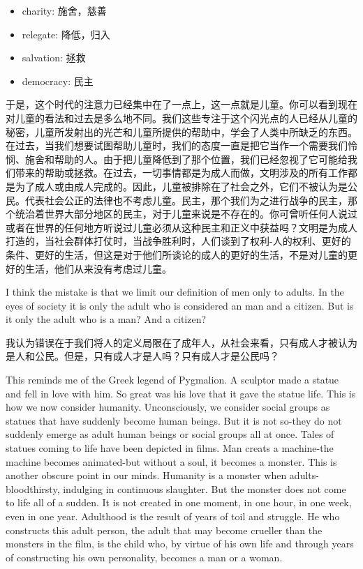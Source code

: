 \documentclass[lang=cn,10pt]{elegantbook}
\begin{document}
\begin{tcolorbox}
    \begin{itemize}
        \item charity: 施舍，慈善
        \item relegate: 降低，归入
        \item salvation: 拯救
        \item democracy: 民主
    \end{itemize}
\end{tcolorbox}

于是，这个时代的注意力已经集中在了一点上，这一点就是儿童。你可以看到现在对儿童的看法和过去是多么地不同。我们这些专注于这个闪光点的人已经从儿童的秘密，儿童所发射出的光芒和儿童所提供的帮助中，学会了人类中所缺乏的东西。在过去，当我们想要试图帮助儿童时，我们的态度一直是把它当作一个需要我们怜悯、施舍和帮助的人。由于把儿童降低到了那个位置，我们已经忽视了它可能给我们带来的帮助或拯救。在过去，一切事情都是为成人而做，文明涉及的所有工作都是为了成人或由成人完成的。因此，儿童被排除在了社会之外，它们不被认为是公民。代表社会公正的法律也不考虑儿童。民主，那个我们为之进行战争的民主，那个统治着世界大部分地区的民主，对于儿童来说是不存在的。你可曾听任何人说过或者在世界的任何地方听说过儿童必须从这种民主和正义中获益吗？文明是为成人打造的，当社会群体打仗时，当战争胜利时，人们谈到了权利-人的权利、更好的条件、更好的生活，但这是对于他们所谈论的成人的更好的生活，不是对儿童的更好的生活，他们从来没有考虑过儿童。

I think the mistake is that we limit our definition of men only to adults. In the eyes of society it is only the adult who is considered an man and a citizen. But is it only the adult who is a man? And a citizen?

我认为错误在于我们将人的定义局限在了成年人，从社会来看，只有成人才被认为是人和公民。但是，只有成人才是人吗？只有成人才是公民吗？

This reminds me of the Greek legend of Pygmalion. A sculptor made a statue and fell in love with him. So great was his love that it gave the statue life. This is how we now consider humanity. Unconsciously, we consider social groups as statues that have suddenly become human beings. But it is not so-they do not suddenly emerge as adult human beings or social groups all at once. Tales of statues coming to life have been depicted in films. Man creats a machine-the machine becomes animated-but without a soul, it becomes a monster. This is another obscure point in our minds. Humanity is a monster when adults-bloodthirsty, indulging in continuous slaughter. But the monster does not come to life all of a sudden. It is not created in one moment, in one hour, in one week, even in one year. Adulthood is the result of years of toil and struggle. He who constructs this adult person, the adult that may become crueller than the monsters in the film, is the child who, by virtue of his own life and through years of constructing his own personality, becomes a man or a woman.
\end{document}
